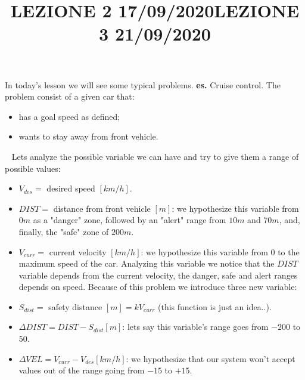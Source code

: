 \title{LEZIONE 2 17/09/2020}\newline
\newline
In today's lesson we will see some typical problems.\newline
\newline
\textbf{es.} Cruise control.\newline
The problem consist of a given car that:
\begin{itemize}
    \item has a goal speed as defined;
    \item wants to stay away from front vehicle.
\end{itemize}
\ \newline
Lets analyze the possible variable we can have and try to give them a range of possible values:
\begin{itemize}
    \item $V_{des} = $ desired speed $[km/h]$.
    \item $DIST =$ distance from front vehicle $[m]$: we hypothesize this variable from $0m$ as a "danger" zone, followed by an "alert" range from $10m$ and $70m$, and, finally, the "safe" zone of $200m$.
    \item $V_{curr} = $ current velocity $[km/h]$: we hypothesize this variable from $0$ to the maximum speed of the car. Analyzing this variable we notice that the $DIST$ variable depends from the current velocity, the danger, safe and alert ranges depends on speed. Because of this problem we introduce three new variable:
    \item $S_{dist} = $ safety distance $[m] = k V_{curr}$ (this function is just an idea..).
    \item $\Delta DIST = DIST - S_{dist} [m]$: lets say this variable's range goes from $-200$ to $50$.
    \item $\Delta VEL = V_{curr} - V_{des} [km/h]$: we hypothesize that our system won't accept values out of the range going from $-15$ to $+15$.
\end{itemize}
\ \newline
{}\newline
{}
\newpage
\title{LEZIONE 3 21/09/2020}\newline
